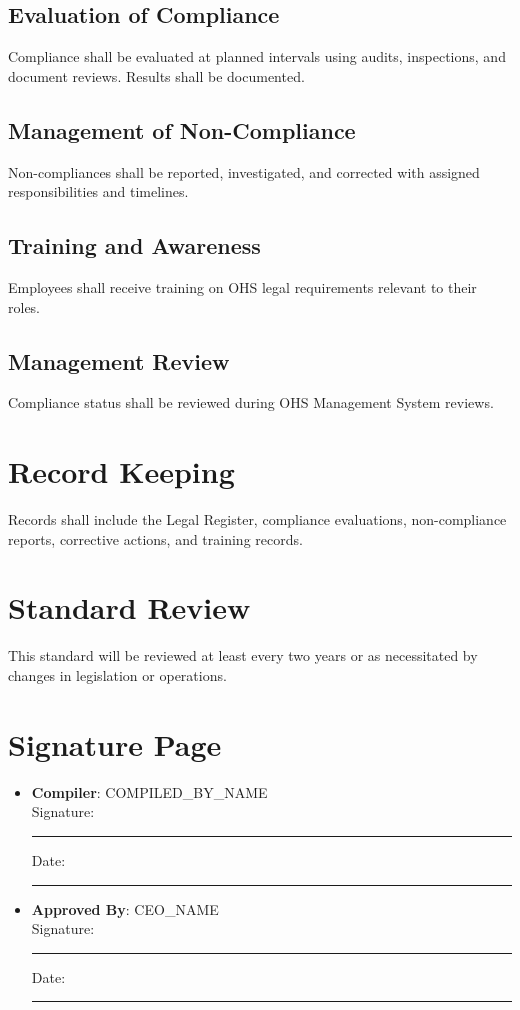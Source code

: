 \documentclass[11pt]{article}
\newcommand{\compilerName}{{{COMPILED_BY_NAME}}}
\begin{document}
\subsection{Evaluation of Compliance}
Compliance shall be evaluated at planned intervals using audits, inspections, and document reviews. Results shall be documented.

\subsection{Management of Non-Compliance}
Non-compliances shall be reported, investigated, and corrected with assigned responsibilities and timelines.

\subsection{Training and Awareness}
Employees shall receive training on OHS legal requirements relevant to their roles.

\subsection{Management Review}
Compliance status shall be reviewed during OHS Management System reviews.

\section{Record Keeping}
Records shall include the Legal Register, compliance evaluations, non-compliance reports, corrective actions, and training records.

\section{Standard Review}
This standard will be reviewed at least every two years or as necessitated by changes in legislation or operations.

\section{Signature Page}
\begin{itemize}
  \item \textbf{Compiler}: \compilerName \\
    Signature: \rule{5cm}{0.4pt} \quad Date: \rule{3cm}{0.4pt}
  \item \textbf{Approved By}: {{CEO_NAME}} \\
    Signature: \rule{5cm}{0.4pt} \quad Date: \rule{3cm}{0.4pt}
\end{itemize}
\end{document}
